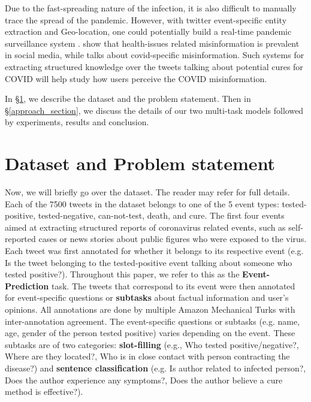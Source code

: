 \documentclass[11pt,a4paper]{article}
\begin{document}
Due to the fast-spreading nature of the infection, it is also difficult to manually trace the spread of the pandemic. However, with twitter event-specific entity extraction and Geo-location, one could potentially build a real-time pandemic surveillance system \citep{surveillance1, surveillance2}. \citet{Bal_Sinha_Dutta_Joshi_Ghosh_Dutt_2020} show that health-issues related misinformation is prevalent in social media, while \citet{covid_infodemic} talks about covid-specific misinformation. Such systems for extracting structured knowledge over the tweets talking about potential cures for COVID will help study how users perceive the COVID misinformation.

In \S\ref{problem_section}, we describe the dataset and the problem statement. Then in \S\ref{approach_section}, we discuss the details of our two multi-task models followed by experiments, results and conclusion.














\section{Dataset and Problem statement} \label{problem_section}

Now, we will briefly go over the dataset. The reader may refer \cite{zong2020extracting} for full details. Each of the 7500 tweets in the dataset belongs to one of the 5 event types: tested-positive, tested-negative, can-not-test, death, and cure. The first four events aimed at extracting structured reports of coronavirus related events, such as self-reported cases or news stories about public figures who were exposed to the virus.
Each tweet was first annotated for whether it belongs to its respective event (e.g. Is the tweet belonging to the tested-positive event talking about someone who tested positive?). Throughout this paper, we refer to this as the \textbf{Event-Prediction} task. The tweets that correspond to its event were then annotated for event-specific questions or \textbf{subtasks} about factual information and user’s opinions. All annotations are done by multiple Amazon Mechanical Turks with inter-annotation agreement. The event-specific questions or subtasks (e.g. name, age, gender of the person tested positive) varies depending on the event. These subtasks are of two categories: \textbf{slot-filling} (e.g., Who tested positive/negative?, Where are they located?, Who is in close contact with person contracting the disease?) and \textbf{sentence classification} (e.g. Is author related to infected person?, Does the author experience any symptoms?, Does the author believe a cure method is effective?).
\end{document}
